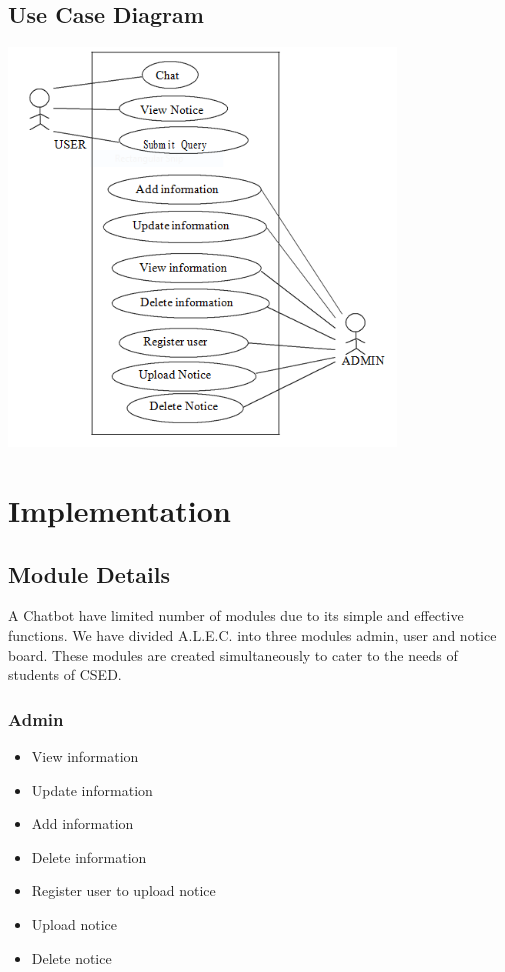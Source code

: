 \documentclass{mnnit}
\begin{document}
\section{Use Case Diagram}
\includegraphics[width=\textwidth, height=300pt]{images/u1.png}



\chapter{Implementation}

\section{Module Details}
A Chatbot have limited number of modules due to its simple and effective functions.  We have divided A.L.E.C. into three modules admin, user and notice board.  These modules are created simultaneously to cater to the needs of students of CSED.
\subsection{Admin}
\begin{itemize}
    \item View information
    \item Update information
    \item Add information
    \item Delete information
    \item Register user to upload notice
    \item Upload notice
    \item Delete notice
\end{itemize}
\end{document}
